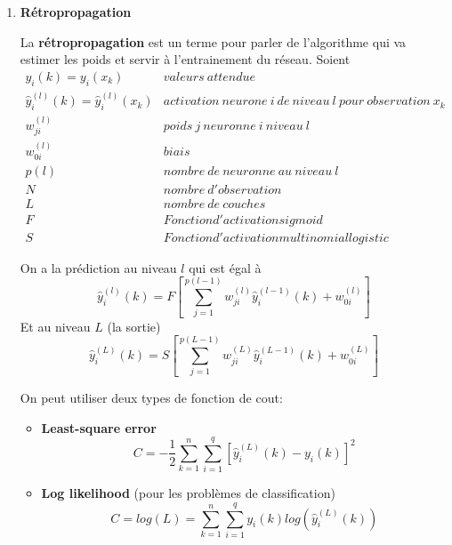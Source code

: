 \documentclass[a4paper, 11pt, onecolumn]{article}
\begin{document}
\begin{enumerate}
\item \textbf{Rétropropagation}

  La \textbf{rétropropagation} est un terme pour parler de l'algorithme qui va estimer les poids et servir à l'entrainement du réseau. Soient 
$$\begin{array}{ll}
y_i(k)=y_i(x_k) & valeurs\ attendue\\
\widehat{y}_i^{(l)}(k)=\widehat{y}_i^{(l)}(x_k) & activation\ neurone\ i\ de\ niveau\ l\ pour\ observation\ x_k\\
w_{ji}^{(l)} & poids\ j\ neuronne\ i\ niveau\ l\\
w_{0i}^{(l)} & biais\\
p(l) & nombre\ de\ neuronne\ au\ niveau\ l\\
N & nombre\ d'observation\\
L & nombre\ de\ couches\\
F & Fonction d'activation sigmoid\\
S & Fonction d'activation multinomial logistic
\end{array}$$

On a la prédiction au niveau $l$ qui est égal à
$$\widehat{y}_i^{(l)}(k) = F[\sum_{j=1}^{p(l-1)}w_{ji}^{(l)}\widehat{y}_i^{(l-1)}(k)+w_{0i}^{(l)}]$$
Et au niveau $L$ (la sortie)
$$\widehat{y}_i^{(L)}(k) = S[\sum_{j=1}^{p(L-1)}w_{ji}^{(L)}\widehat{y}_i^{(L-1)}(k)+w_{0i}^{(L)}]$$

On peut utiliser deux types de fonction de cout:
\begin{itemize}
\item \textbf{Least-square error} $$C = -\frac{1}{2}\sum_{k=1}^n\sum_{i=1}^q[\widehat y_i^{(L)}(k)-y_i(k)]^2$$
\item \textbf{Log likelihood} (pour les problèmes de classification) $$C = log(L) = \sum_{k=1}^n\sum_{i=1}^q y_i(k)log(\widehat y_i^{(L)}(k))$$
\end{itemize}


\end{enumerate}
\end{document}
